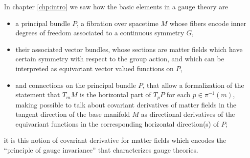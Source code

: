 In chapter \ref{chp:intro} we saw how the basic elements in a gauge theory are 
    \begin{itemize}
        
    \item a principal bundle $P$, a fibration over spacetime $M$ whose fibers encode inner degrees of freedom associated to a continuous symmetry $G$,
    
    \item their associated vector bundles, whose sections are matter fields which have certain symmetry with respect to the group action, and which can be interpreted as equivariant vector valued functions on $P$,
    
    \item and connections on the principal bundle $P$, that allow a formalization of the statement that $T_m M$ is the horizontal part of $T_p P$ for each $p \in \pi^{-1}(m)$, making possible to talk about covariant derivatives of matter fields in the tangent direction of the base manifold $M$ as directional derivatives of the equivariant functions in the corresponding horizontal direction(s) of $P$;
    
    \end{itemize}
it is this notion of covariant derivative for matter fields which encodes the ``principle of gauge invariance'' that characterizes gauge theories.

